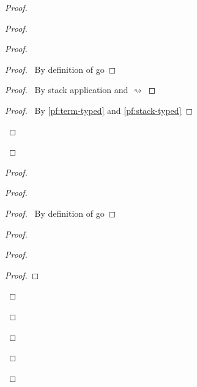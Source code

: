 \documentclass[a4paper]{article}
\begin{document}
\begin{proof}
\begin{proof}
    \begin{proof}
      \begin{proof}
        \pf\ By definition of \textsf{go}
      \end{proof}
      \begin{proof}
        \pf\ By stack application and $\rightsquigarrow$
      \end{proof}
      \begin{proof}
        \pf\ By \ref{pf:term-typed} and \ref{pf:stack-typed}
      \end{proof}
    \end{proof}
  \end{proof}
  \begin{proof}
    \begin{proof}
      \begin{proof}
        \pf\ By definition of \textsf{go}
      \end{proof}
      \begin{proof}
        \begin{proof}
          \begin{proof}

\end{proof}
\end{proof}
\end{proof}
\end{proof}
\end{proof}
\end{proof}
\end{document}
